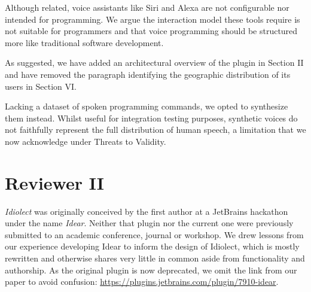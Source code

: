 \documentclass[journal,12pt,onecolumn,draftclsnofoot,]{IEEEtran}
\begin{document}
%
%
%

Although related, voice assistants like Siri and Alexa are not configurable nor intended for programming. We argue the interaction model these tools require is not suitable for programmers and that voice programming should be structured more like traditional software development.

As suggested, we have added an architectural overview of the plugin in Section II and have removed the paragraph identifying the geographic distribution of its users in Section VI.



Lacking a dataset of spoken programming commands, we opted to synthesize them instead. Whilst useful for integration testing purposes, synthetic voices do not faithfully represent the full distribution of human speech, a limitation that we now acknowledge under Threats to Validity.

\section{Reviewer II}

\textit{Idiolect} was originally conceived by the first author at a JetBrains hackathon under the name \textit{Idear}. Neither that plugin nor the current one were previously submitted to an academic conference, journal or workshop. We drew lessons from our experience developing Idear to inform the design of Idiolect, which is mostly rewritten and otherwise shares very little in common aside from functionality and authorship. As the original plugin is now deprecated, we omit the link from our paper to avoid confusion: \url{https://plugins.jetbrains.com/plugin/7910-idear}.
\end{document}
